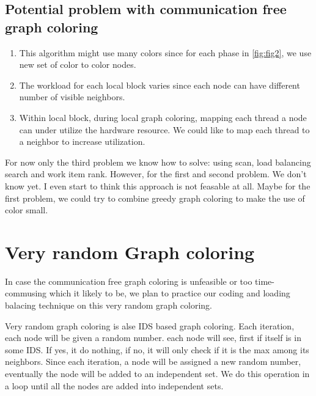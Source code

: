 \documentclass[12pt] {article}
\begin{document}
\subsection*{Potential problem with communication free graph coloring}
\begin{enumerate}
\item This algorithm might use many colors since for each phase in \ref{fig:fig2}, we use new set of color to color nodes.
\item The workload for each local block varies since each node can have different number of visible neighbors.
\item Within local block, during local graph coloring, mapping each thread a node can under utilize the hardware resource. We could like to map each thread to a neighbor to increase utilization.
\end{enumerate}
For now only the third problem we know how to solve: using scan, load balancing search and work item rank. However, for the first and second problem. We don't know yet. I even start to think this approach is not feasable at all.
Maybe for the first problem, we could try to combine greedy graph coloring to make the use of color small.

\section*{Very random Graph coloring}
In case the communication free graph coloring is unfeasible or too time-commusing which it likely to be, we plan to practice our coding and loading balacing technique on this very random graph coloring. 

Very random graph coloring is alse IDS based graph coloring. Each iteration, each node will be given a random number. each node will see, first if itself is in some IDS. If yes, it do nothing, if no, it will only check if it is the max among its neighbors. Since each iteration, a node will be assigned a new random number, eventually the node will be added to an independent set. We do this operation in a loop until all the nodes are added into independent sets.
\end{document}

